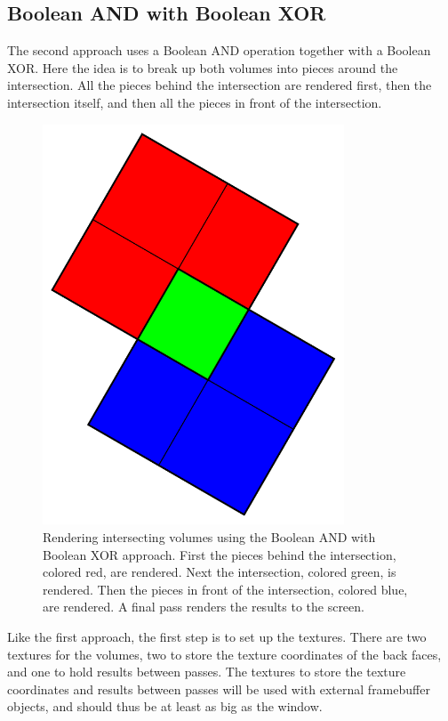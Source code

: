 \documentclass{article}
\begin{document}
\subsection{Boolean AND with Boolean XOR}

The second approach uses a Boolean AND operation together with a Boolean XOR.
Here the idea is to break up both volumes into pieces around the intersection.
All the pieces behind the intersection are rendered first, then the intersection
itself, and then all the pieces in front of the intersection.

\begin{figure}
\centering
\includegraphics[width=0.8\textwidth]{boolean-xor.pdf}
\caption{
Rendering intersecting volumes using the Boolean AND with Boolean XOR approach.
First the pieces behind the intersection, colored red, are rendered.  Next the
intersection, colored green, is rendered.  Then the pieces in front of the
intersection, colored blue, are rendered.  A final pass renders the results to
the screen.
}
\label{boolean-xor}
\end{figure}

Like the first approach, the first step is to set up the textures.  There are
two textures for the volumes, two to store the texture coordinates of the back
faces, and one to hold results between passes.  The textures to store the
texture coordinates and results between passes will be used with external
framebuffer objects, and should thus be at least as big as the window.
\end{document}
